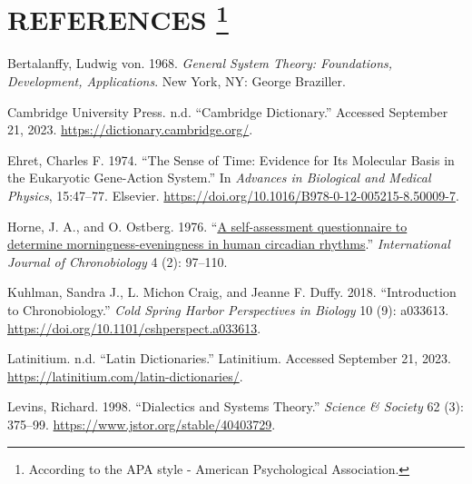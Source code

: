 \documentclass[
  12pt,
  a4paper,
  oneside]{tesesusp}
\newlength{\cslhangindent}
\newlength{\cslentryspacingunit} %
\newenvironment{CSLReferences}[2] %
 {%
  \setlength{\parindent}{0pt}
  \ifodd #1
  \let\oldpar\par
  \def\par{\hangindent=\cslhangindent\oldpar}
  \fi
  \setlength{\parskip}{#2\cslentryspacingunit}
 }%
 {}
\begin{document}

\hypertarget{references-1}{%
\chapter*{\texorpdfstring{REFERENCES
\footnote{According to the APA style - American Psychological
  Association.}}{REFERENCES }}\label{references-1}}


\postextual

\hypertarget{refs}{}
\begin{CSLReferences}{1}{0}
\leavevmode{}%
Bertalanffy, Ludwig von. 1968. \emph{General System Theory: Foundations,
Development, Applications}. New York, NY: George Braziller.

\leavevmode{}%
Cambridge University Press. n.d. {``Cambridge Dictionary.''} Accessed
September 21, 2023. \url{https://dictionary.cambridge.org/}.

\leavevmode{}%
Ehret, Charles F. 1974. {``The Sense of Time: Evidence for Its Molecular
Basis in the Eukaryotic Gene-Action System.''} In \emph{Advances in
Biological and Medical Physics}, 15:47--77. Elsevier.
\url{https://doi.org/10.1016/B978-0-12-005215-8.50009-7}.

\leavevmode{}%
Horne, J. A., and O. Ostberg. 1976.
{``\href{https://www.ncbi.nlm.nih.gov/pubmed/1027738}{A self-assessment
questionnaire to determine morningness-eveningness in human circadian
rhythms}.''} \emph{International Journal of Chronobiology} 4 (2):
97--110.

\leavevmode{}%
Kuhlman, Sandra J., L. Michon Craig, and Jeanne F. Duffy. 2018.
{``Introduction to Chronobiology.''} \emph{Cold Spring Harbor
Perspectives in Biology} 10 (9): a033613.
\url{https://doi.org/10.1101/cshperspect.a033613}.

\leavevmode{}%
Latinitium. n.d. {``Latin Dictionaries.''} Latinitium. Accessed
September 21, 2023. \url{https://latinitium.com/latin-dictionaries/}.

\leavevmode{}%
Levins, Richard. 1998. {``Dialectics and Systems Theory.''}
\emph{Science \& Society} 62 (3): 375--99.
\url{https://www.jstor.org/stable/40403729}.


\end{CSLReferences}
\end{document}
